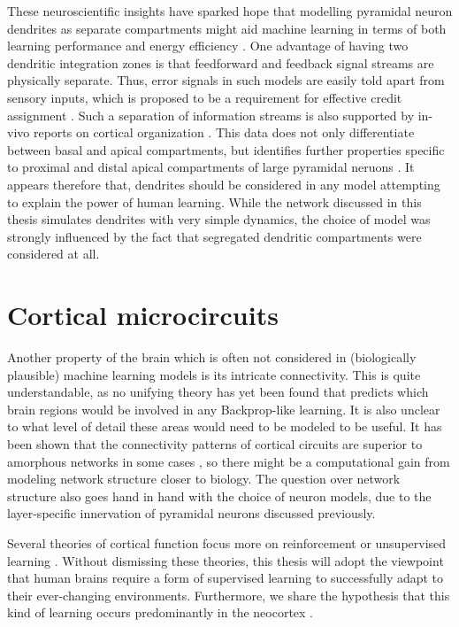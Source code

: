 These neuroscientific insights have  sparked hope that modelling pyramidal neuron dendrites as separate compartments
might aid machine learning in terms of both learning performance and energy efficiency
\citep{Chavlis2021,guerguiev2017towards,Richards2019,Eyal2018}. One advantage of having two dendritic integration zones
is that feedforward and feedback signal streams are physically separate. Thus, error signals in such models are easily
told apart from sensory inputs, which is proposed to be a requirement for effective credit assignment
\citep{Richards2019}. Such a separation of information streams is also supported by in-vivo reports on cortical
organization \citep{Gilbert2013,Larkum2009,Ishizuka1995}. This data does not only differentiate between basal and apical
compartments, but identifies further properties specific to proximal and distal apical compartments of large pyramidal
neruons \citep{Larkum2018}. It appears therefore that, dendrites should be considered in any model attempting to explain
the power of human learning. While the network discussed in this thesis simulates dendrites with very simple dynamics,
the choice of model was strongly influenced by the fact that segregated dendritic compartments were considered at all.




\section{Cortical microcircuits}

Another property of the brain which is often not considered in (biologically plausible) machine learning models is its
intricate connectivity. This is quite understandable, as no unifying theory has yet been found that predicts which brain
regions would be involved in any Backprop-like learning. It is also unclear to what level of detail these areas would
need to be modeled to be useful. It has been shown that the connectivity patterns of cortical circuits are superior to
amorphous networks in some cases \citep{haeusler2007statistical}, so there might be a computational gain from modeling
network structure closer to biology. The question over network structure also goes hand in hand with the choice of
neuron models, due to the layer-specific innervation of pyramidal neurons discussed previously.


Several theories of cortical function focus more on reinforcement \citep{Legenstein2008} or unsupervised learning
\citep{George2009,hausler2017inhibitory}. Without dismissing these theories, this thesis will adopt the viewpoint that
human brains require a form of supervised learning to successfully adapt to their ever-changing environments.
Furthermore, we share the hypothesis that this kind of learning occurs predominantly in the neocortex
\citep{Marblestone2016}.


